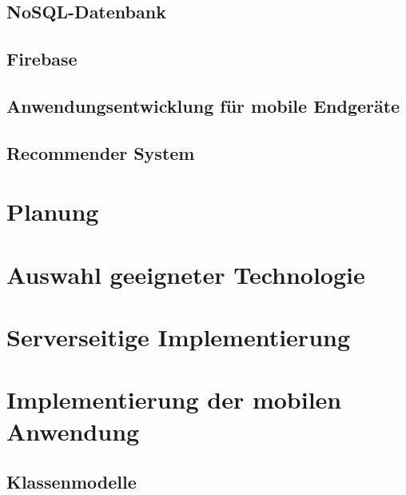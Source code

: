 \documentclass[11pt,a4paper]{article}
\begin{document}
\clearpage
\subsection{NoSQL-Datenbank}

\subsection{Firebase}
\label{sec:firebase}

\subsection{Anwendungsentwicklung für mobile Endgeräte}

\subsection{Recommender System}
\label{sec:recomandationSystem}


\clearpage
\section{Planung}



\clearpage
\section{Auswahl geeigneter Technologie}


\clearpage
\section{Serverseitige Implementierung}


\clearpage
\section{Implementierung der mobilen Anwendung}
\subsection{Klassenmodelle}		

\end{document}
